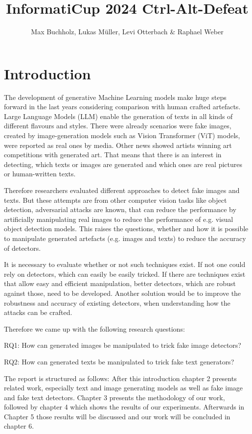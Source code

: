 \documentclass{article} %
\title{InformatiCup 2024 Ctrl-Alt-Defeat}
\author{Max Buchholz, Lukas Müller, Levi Otterbach \& Raphael Weber}
\begin{document}
\maketitle

\begin{abstract}

\end{abstract}

\section{Introduction}
The development of generative Machine Learning models make huge steps forward in the last years considering comparison with human crafted artefacts. Large Language Models (LLM) enable the generation of texts in all kinds of different flavours and styles. There were already scenarios were fake images, created by image-generation models such as Vision Transformer (ViT) models, were reported as real ones by media. Other news showed artists winning art competitions with generated art. That means that there is an interest in detecting, which texts or images are generated and which ones are real pictures or human-written texts.

Therefore researchers evaluated different approaches to detect fake images and texts. But these attempts are from other computer vision tasks like object detection, adversarial attacks are known, that can reduce the performance by artificially manipulating real images to reduce the performance of e.g. visual object detection models. This raises the questions, whether and how it is possible to manipulate generated artefacts (e.g. images and texts) to reduce the accuracy of detectors.


It is necessary to evaluate whether or not such techniques exist. If not one could rely on detectors, which can easily be easily tricked. If there are techniques exist that allow easy and efficient manipulation, better detectors, which are robust against those, need to be developed. Another solution would be to improve the robustness and accuracy of existing detectors, when understanding how the attacks can be crafted.

Therefore we came up with the following research questions:


RQ1: How can generated images be manipulated to trick fake image detectors?


RQ2: How can generated texts be manipulated to trick fake text generators?


The report is structured as follows: After this introduction chapter 2 presents related work, especially text and image generating models as well as fake image and fake text detectors. Chapter 3 presents the methodology of our work, followed by chapter 4 which shows the results of our experiments. Afterwards in  Chapter 5 those results will be discussed and our work will be concluded in chapter 6.
\end{document}
